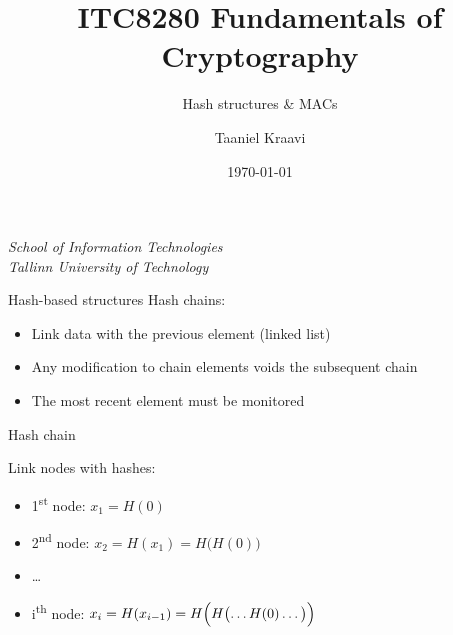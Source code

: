 \graphicspath{ {../../images/} }
\usetikzlibrary{external,overlay-beamer-styles}
\usepackage{caption}

\title{ITC8280 Fundamentals of Cryptography}
\subtitle{Hash structures \& MACs}
\date{\today}
\author{Taaniel Kraavi}
\institute%
{%
  \textit{School of Information Technologies}\\
  \textit{Tallinn University of Technology}
}


\begin{frame}
  \titlepage
\end{frame}

\begin{frame}{Hash-based structures}
  Hash chains:
  \begin{itemize}[<+(1)->]
    \item Link data with the previous element (linked list)
    \item Any modification to chain elements voids the subsequent chain
    \item The most recent element must be monitored
  \end{itemize}
\end{frame}

\begin{frame}{Hash chain}
  \begin{center}
  \end{center}

  \pause
  Link nodes with hashes:
  \begin{itemize}[<+(1)->]
    \item 1\textsuperscript{st} node: $x_1 = H(0)$
    \item 2\textsuperscript{nd} node: $x_2 = H(x_1) = H\bigl(H(0)\bigr)$
    \item \dots
    \item i\textsuperscript{th} node: $x_i = H(x_{i-1}) = H\Bigl(H\bigl(\dots H(0)\dots\bigr)\Bigr)$
  \end{itemize}
\end{frame}

